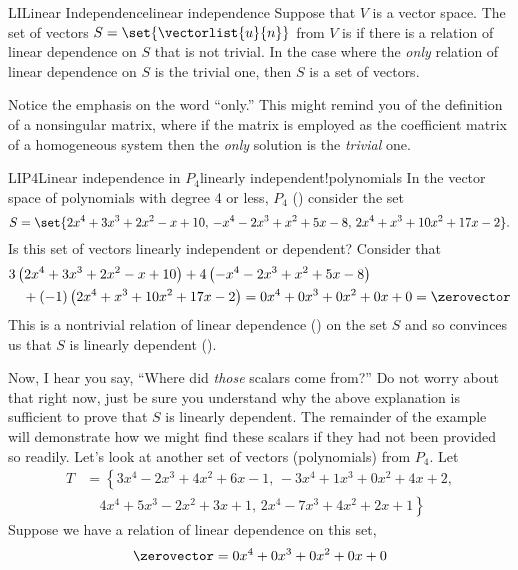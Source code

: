 %
\begin{definition}{LI}{Linear Independence}{linear independence}
Suppose that $V$ is a vector space.
The set of vectors $S=\set{\vectorlist{u}{n}}$ from $V$ is  if there is a relation of linear dependence on $S$ that is not trivial.  In the case where the {\em only} relation of linear dependence on $S$ is the trivial one, then $S$ is a  set of vectors.
\end{definition}
%
Notice the emphasis on the word ``only.''  This might remind you of the definition of a nonsingular matrix, where if the matrix is employed as the coefficient matrix of a homogeneous system then the {\em only} solution is the {\em trivial} one.
%
%
\begin{example}{LIP4}{Linear independence in $P_4$}{linearly independent!polynomials}
In the vector space of polynomials with degree 4 or less, $P_4$ () consider the set
%
\begin{equation*}
S=\set{
2x^4+3x^3+2x^2-x+10,\,
-x^4-2x^3+x^2+5x-8,\,
2x^4+x^3+10x^2+17x-2
}.
\end{equation*}
%
Is this set of vectors linearly independent or dependent?  Consider that
%
\begin{align*}
&3\left(2x^4+3x^3+2x^2-x+10\right)
+4\left(-x^4-2x^3+x^2+5x-8\right)\\
&\quad +(-1)\left(2x^4+x^3+10x^2+17x-2\right)
=0x^4+0x^3+0x^2+0x+0=\zerovector
\end{align*}
%
This is a nontrivial relation of linear dependence () on the set $S$ and so convinces us that $S$ is linearly dependent ().\par
%
Now, I hear you say, ``Where did {\em those} scalars come from?''  Do not worry about that right now, just be sure you understand why the above explanation is sufficient to prove that $S$ is linearly dependent.  The remainder of the example will demonstrate how we might find these scalars if they had not been provided so readily.
%
Let's look at another set of vectors (polynomials) from $P_4$.  Let
%
\begin{align*}
T&=\left\{
3x^4-2x^3+4x^2+6x-1,\,
-3x^4+1x^3+0x^2+4x+2,\right.\\
&\quad \left.4x^4+5x^3-2x^2+3x+1,\,
2x^4-7x^3+4x^2+2x+1\right\}
\end{align*}
%
Suppose we have a relation of linear dependence on this set,
%
\begin{align*}
\zerovector&=0x^4+0x^3+0x^2+0x+0\\

\end{align*}
\end{example}
